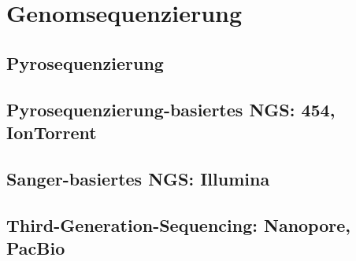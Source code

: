 \section{Genomsequenzierung}



\subsection{Pyrosequenzierung}

\subsection{Pyrosequenzierung-basiertes NGS: 454, IonTorrent}

\subsection{Sanger-basiertes NGS: Illumina}

\subsection{Third-Generation-Sequencing: Nanopore, PacBio}

